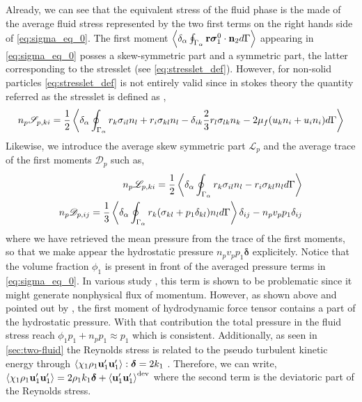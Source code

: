 Already, we can see that the equivalent stress of the fluid phase is the made of the average fluid stress represented by the two first terms on the right hands side of \ref{eq:sigma_eq_0}. 
The first moment $\left<\delta_\alpha \oint_{\Gamma_\alpha} \textbf{r}\bm{\sigma}_1^0 \cdot \textbf{n}_2 d\Gamma\right>$ appearing in \ref{eq:sigma_eq_0} posses a skew-symmetric part and a symmetric part, the latter corresponding to the stresslet (see \ref{eq:stresslet_def}).
However, for non-solid particles \ref{eq:stresslet_def} is not entirely valid since in stokes theory the quantity referred as the stresslet is defined as \citet{pozrikidis1992boundary,kim2013microhydrodynamics},
\begin{equation}
    \label{eq:stresslet_def}
    n_p \mathscr{S}_{p,ki}
    = \frac{1}{2}
    \left<\delta_\alpha \oint_{\Gamma_\alpha} 
        r_k \sigma_{il}n_l + r_i \sigma_{kl}n_l 
        - \delta_{ik}
        \frac{2}{3}
        r_l \sigma_{lk}n_k
        - 2 \mu_f (u_k n_i+u_i n_i)
     d\Gamma\right>
\end{equation}
Likewise, we introduce the average skew symmetric part $\mathscr{L}_p$ and the average trace of the first moments $\mathscr{D}_p$ such as, 
\begin{align}
    \label{eq:torque_def}
    n_p \mathscr{L}_{p,ki}
    = \frac{1}{2}\left<\delta_\alpha \oint_{\Gamma_\alpha}  r_k \sigma_{il}n_l - r_i \sigma_{kl}n_l  d\Gamma\right>\\
    \label{eq:trace_def}
    n_p \mathscr{D}_{p,ij}
    = \frac{1}{3}\left<\delta_\alpha \oint_{\Gamma_\alpha}  r_k (\sigma_{kl} + p_1 \delta_{kl})n_l  d\Gamma\right> \delta_{ij}
    - n_p v_p p_1 \delta_{ij}
\end{align}
where we have retrieved the mean pressure from the trace of the first moments, so that we make appear the hydrostatic pressure  $n_p v_p p_1 \bm\delta$ explicitely.  
Notice that the volume fraction $\phi_1$ is present in front of the averaged pressure terms in \ref{eq:sigma_eq_0}.  
In various study \citep{prosperetti2009computational,chu2016flux}, this term is shown to be problematic  since it might generate nonphysical flux of momentum. 
However, as shown above and pointed out by  \citet{zhang1997momentum,jackson1997locally}, the first moment of hydrodynamic force tensor contains a part of the hydrostatic pressure.
With that contribution the total pressure in the fluid stress reach $\phi_1p_1 + n_p p_1 \approx p_1$ which is consistent.
Additionally, as seen in \ref{sec:two-fluid} the Reynolds stress is related to the pseudo turbulent kinetic energy through $\left<\chi_1 \rho_1\textbf{u}_1'\textbf{u}_1'\right> : \bm\delta = 2k_1$ . 
Therefore, we can write, $\left<\chi_1 \rho_1\textbf{u}_1'\textbf{u}_1'\right> = 2 \rho_1 k_1 \bm\delta + \left<\textbf{u}_1'\textbf{u}_1'\right>^\text{dev}$ where the second term is the deviatoric part of the Reynolds stress. 

